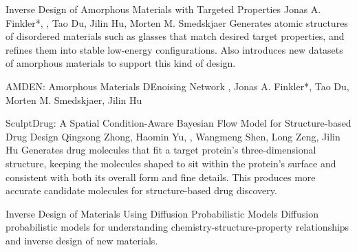 {Inverse Design of Amorphous Materials with Targeted Properties}
{Jonas A. Finkler*, \me*, Tao Du, Jilin Hu, Morten M. Smedskjaer}
{Generates atomic structures of disordered materials such as glasses that match desired target properties, and refines them into stable low-energy configurations. Also introduces new datasets of amorphous materials to support this kind of design.}

{AMDEN: Amorphous Materials DEnoising Network}
{\me*, Jonas A. Finkler*, Tao Du, Morten M. Smedskjaer, Jilin Hu}{}

{SculptDrug: A Spatial Condition-Aware Bayesian Flow Model for Structure-based Drug Design}
{Qingsong Zhong, Haomin Yu, \me, Wangmeng Shen, Long Zeng, Jilin Hu}
{Generates drug molecules that fit a target protein's three-dimensional structure, keeping the molecules shaped to sit within the protein's surface and consistent with both its overall form and fine details. This produces more accurate candidate molecules for structure-based drug discovery.}

{Inverse Design of Materials Using Diffusion Probabilistic Models}
{}
{Diffusion probabilistic models for understanding chemistry-structure-property relationships and inverse design of new materials.}
